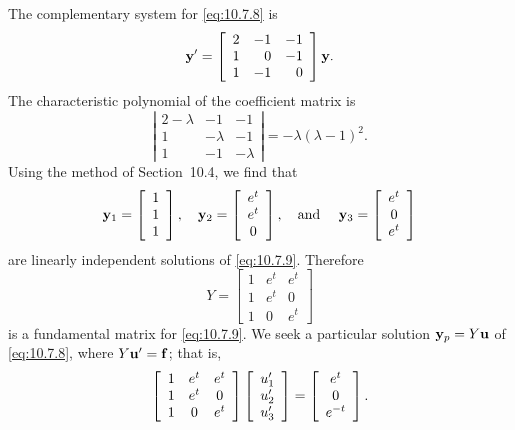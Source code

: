 \begin{examplesolution}
 The complementary system for \eqref{eq:10.7.8} is
\begin{equation}
  \label{eq:10.7.9}{\bf y}'=\left[\begin{array}{rrr} 2&-1&-1\\1&0&-1\\1&-1&0\end{array}\right]{\bf y}.
\end{equation}
The characteristic polynomial of the coefficient matrix is
\[
  \left|
  \begin{array}{ccc}
    2-\lambda & -1       & -1       \\
    1         & -\lambda & -1       \\
    1         & -1       & -\lambda
  \end{array}\right|= -\lambda(\lambda-1)^{2}.
\]
Using the method of Section~10.4, we find that
\[
  {\bf y}_{1}=\left[
  \begin{array}{c}
    1 \\
    1 \\
    1
  \end{array}\right],\quad{\bf y}_{2}=\left[
  \begin{array}{c}
    e^{t} \\
    e^{t} \\
    0
  \end{array}\right], \mbox{\quad and \quad}{\bf y}_{3}=\left[
  \begin{array}{c}
    e^{t} \\
    0     \\
    e^{t}
  \end{array}\right]
\]
are linearly independent solutions of \eqref{eq:10.7.9}. Therefore
\[
  Y=\left[
  \begin{array}{ccc}
    1 & e^{t} & e^{t} \\
    1 & e^{t} & 0     \\
    1 & 0     & e^{t}
  \end{array}\right]
\]
is a fundamental matrix for \eqref{eq:10.7.9}. We seek a particular solution ${\bf y}_{p}=Y{\bf u}$
of \eqref{eq:10.7.8}, where $Y{\bf u}'={\bf f}$; that is,
\[
  \left[
  \begin{array}{ccc}
    1 & e^{t} & e^{t} \\
    1 & e^{t} & 0     \\
    1 & 0     & e^{t}
  \end{array}\right] \left[\begin{array}{r}u_{1}'\\u_{2}'\\u_{3}'\end{array}\right]= \left[
  \begin{array}{c}
    e^{t}  \\
    0      \\
    e^{-t}
  \end{array}\right].
\]
\end{examplesolution}
